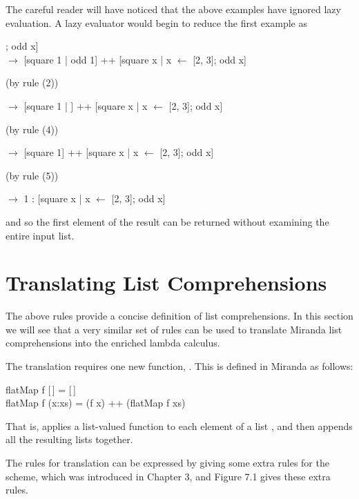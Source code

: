 The careful reader will have noticed that the above examples have ignored
lazy evaluation. A lazy evaluator would begin to reduce the first example as
\begin{mlcoded}
    [square x | x $\leftarrow$ [1, 2, 3]; odd x]\\
        \phantom{w} $\rightarrow$ [square 1 | odd 1] ++ [square x | x $\leftarrow$ [2, 3]; odd x]
\end{mlcoded}
\hfill (by rule (2))
\begin{mlcoded}
        \phantom{w} $\rightarrow$ [square 1 | ] ++ [square x | x $\leftarrow$ [2, 3]; odd x]
\end{mlcoded}
\hfill (by rule (4))
\begin{mlcoded}
        \phantom{w} $\rightarrow$ [square 1] ++ [square x | x $\leftarrow$ [2, 3]; odd x]
\end{mlcoded}
\hfill (by rule (5))
\begin{mlcoded}
        \phantom{w} $\rightarrow$ 1 : [square x | x $\leftarrow$ [2, 3]; odd x]
\end{mlcoded}
\noindent
and so the first element of the result can be returned without examining the
entire input list.

\section{Translating List Comprehensions}
The above rules provide a concise definition of list comprehensions. In this
section we will see that a very similar set of rules can be used to translate
Miranda list comprehensions into the enriched lambda calculus.

The translation requires one new function, . This is defined in
Miranda as follows:
\begin{mlcoded}
    flatMap f [\,] = [\,] \\
    flatMap f (x:xs) = (f x) ++ (flatMap f xs)
\end{mlcoded}
That is,  applies a list-valued function  to each element of a list
, and then appends all the resulting lists together.

The rules for translation can be expressed by giving some extra rules for the
 scheme, which was introduced in Chapter 3, and Figure 7.1 gives these
extra rules.

